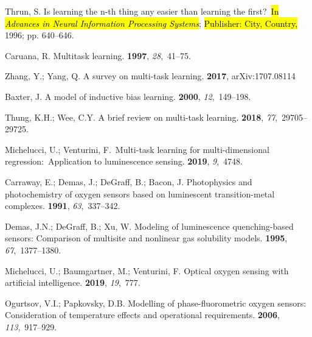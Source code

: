 \documentclass[sensors,article,accept,moreauthors,pdftex,10pt,a4paper]{Definitions/mdpi}
\begin{document}
\begin{thebibliography}{999}
Thrun, S.
\newblock Is learning the n-th thing any easier than learning the first?~\newblock  \hl{In \emph{Advances in Neural Information Processing Systems}}; \hl{Publisher: City, Country,} 1996; pp.
  640--646. %

Caruana, R.
\newblock Multitask learning.
 {\bf 1997}, {\em 28},~41--75.

Zhang, Y.; Yang, Q.
\newblock A survey on multi-task learning.
 {\bf 2017}, arXiv:1707.08114

Baxter, J.
\newblock A model of inductive bias learning.
 {\bf 2000}, {\em
  12},~149--198.

Thung, K.H.; Wee, C.Y.
\newblock A brief review on multi-task learning.
 {\bf 2018}, {\em
  77},~29705--29725.

Michelucci, U.; Venturini, F.~\newblock Multi-task learning for multi-dimensional regression:~Application to
  luminescence sensing.
 {\bf 2019}, {\em 9},~4748.

Carraway, E.; Demas, J.; DeGraff, B.; Bacon, J.
\newblock Photophysics and photochemistry of oxygen sensors based on
  luminescent transition-metal complexes.
 {\bf 1991}, {\em 63},~337--342.

Demas, J.N.; DeGraff, B.; Xu, W.
\newblock Modeling of luminescence quenching-based sensors: Comparison of
  multisite and nonlinear gas solubility models.
 {\bf 1995}, {\em 67},~1377--1380.

Michelucci, U.; Baumgartner, M.; Venturini, F.
\newblock Optical oxygen sensing with artificial intelligence.
 {\bf 2019}, {\em 19},~777.

Ogurtsov, V.I.; Papkovsky, D.B.
\newblock Modelling of phase-fluorometric oxygen sensors: Consideration of
  temperature effects and operational requirements.
 {\bf 2006}, {\em
  113},~917--929.


\end{thebibliography}
\end{document}

